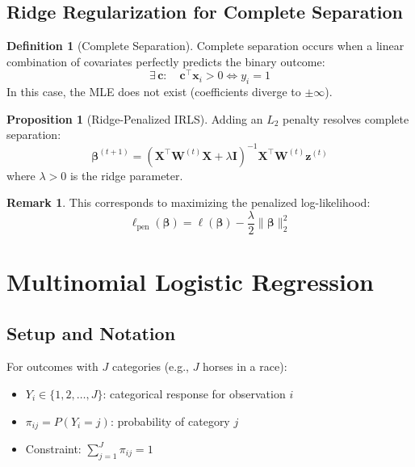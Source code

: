 \documentclass[11pt,letterpaper]{article}
\theoremstyle{definition}
\newtheorem{definition}{Definition}[section]
\newtheorem{proposition}[theorem]{Proposition}
\newtheorem{remark}{Remark}[section]
\newcommand{\X}{\mathbf{X}}
\newcommand{\bb}{\boldsymbol{\beta}}
\newcommand{\W}{\mathbf{W}}
\begin{document}
\subsection{Ridge Regularization for Complete Separation}

\begin{definition}[Complete Separation]
Complete separation occurs when a linear combination of covariates perfectly predicts the binary outcome:
\begin{equation}
    \exists\, \mathbf{c}: \quad \mathbf{c}^\top \mathbf{x}_i > 0 \iff y_i = 1
\end{equation}
In this case, the MLE does not exist (coefficients diverge to $\pm\infty$).
\end{definition}

\begin{proposition}[Ridge-Penalized IRLS]
Adding an $L_2$ penalty resolves complete separation:
\begin{equation}
    \bb^{(t+1)} = (\X^\top \W^{(t)} \X + \lambda \mathbf{I})^{-1} \X^\top \W^{(t)} \mathbf{z}^{(t)}
    \label{eq:ridge-irls}
\end{equation}
where $\lambda > 0$ is the ridge parameter.
\end{proposition}

\begin{remark}
This corresponds to maximizing the penalized log-likelihood:
\begin{equation}
    \ell_{\text{pen}}(\bb) = \ell(\bb) - \frac{\lambda}{2}\|\bb\|_2^2
\end{equation}
\end{remark}

\section{Multinomial Logistic Regression}

\subsection{Setup and Notation}

For outcomes with $J$ categories (e.g., $J$ horses in a race):
\begin{itemize}
    \item $Y_i \in \{1, 2, \ldots, J\}$: categorical response for observation $i$
    \item $\pi_{ij} = P(Y_i = j)$: probability of category $j$
    \item Constraint: $\sum_{j=1}^{J} \pi_{ij} = 1$
\end{itemize}
\end{document}
